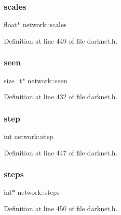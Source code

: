 \mbox{\label{structnetwork_a64c1fa0153559f530cc815fb6b8a95c8}} 
\subsubsection{\texorpdfstring{scales}{scales}}
{\footnotesize\ttfamily float$\ast$ network\+::scales}



Definition at line 449 of file darknet.\+h.

\mbox{\label{structnetwork_aaa4dc3920fc905e52573172d45fccd45}} 
\subsubsection{\texorpdfstring{seen}{seen}}
{\footnotesize\ttfamily size\+\_\+t$\ast$ network\+::seen}



Definition at line 432 of file darknet.\+h.

\mbox{\label{structnetwork_a9ed08472400f140c49ecac3ecd1def87}} 
\subsubsection{\texorpdfstring{step}{step}}
{\footnotesize\ttfamily int network\+::step}



Definition at line 447 of file darknet.\+h.

\mbox{\label{structnetwork_a48fb87937b7ff22cf01875d8d5807cc2}} 
\subsubsection{\texorpdfstring{steps}{steps}}
{\footnotesize\ttfamily int$\ast$ network\+::steps}



Definition at line 450 of file darknet.\+h.

\mbox{\label{structnetwork_ab30643da07e0f787ee0cd2058cd41a6e}} 
